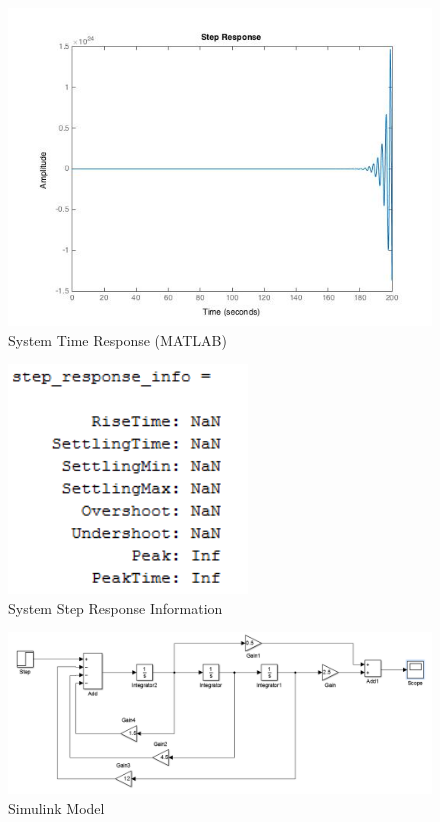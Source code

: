 \documentclass[12pt]{article}
\begin{document}
\begin{figure}[h!] %
   \centering
   \includegraphics[width=6in]{matlab_script_time_response.jpg} 
   \caption{System Time Response (MATLAB)}
   \label{fig:example}
\end{figure}

\newpage

\bigskip
\bigskip
\begin{figure}[h!] %
   \centering
   \includegraphics[width=2.5in]{step_response_info.PNG} 
   \caption{System Step Response Information}
   \label{fig:example}
\end{figure}

\bigskip
\bigskip

\begin{figure}[h!] %
   \centering
   \includegraphics[width=\linewidth]{simulink_model_pic.PNG} 
   \caption{Simulink Model}
   \label{fig:example}
\end{figure}
\end{document}
